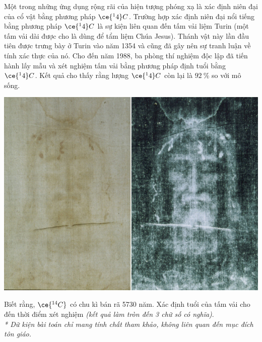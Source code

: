 \begin{ex}
	Một trong những ứng dụng rộng rãi của hiện tượng phóng xạ là xác định niên đại của cổ vật bằng phương pháp $\ce{^14}C$. Trường hợp xác định niên đại nổi tiếng bằng phương pháp $\ce{^14}C$  là sự kiện liên quan đến tấm vải liệm Turin (một tấm vải dài được cho là dùng để tẩm liệm Chúa Jesus). Thánh vật này lần đầu tiên được trưng bày ở Turin vào năm 1354 và cũng đã gây nên sự tranh luận về tính xác thực của nó. Cho đến năm 1988, ba phòng thí nghiệm độc lập đã tiến hành lấy mẫu và xét nghiệm tấm vải bằng phương pháp định tuổi bằng $\ce{^14}C$. Kết quả cho thấy rằng lượng $\ce{^14}C$ còn lại là $\SI{92}{\percent}$  so với mô sống.  
	\begin{center}
		\includegraphics[width=0.4\linewidth]{../figs/VN12-Y24-PH-SYL-031P-3}
	\end{center}
	Biết rằng,   $\ce{^{14}C}$ có chu kì bán rã 5730 năm. Xác định tuổi của tấm vải cho đến thời điểm xét nghiệm \textit{(kết quả làm tròn đến 3 chữ số có nghĩa)}.\\
	\textit{* Dữ kiện bài toán chỉ mang tính chất tham khảo, không liên quan đến mục đích tôn giáo.}
\end{ex}
